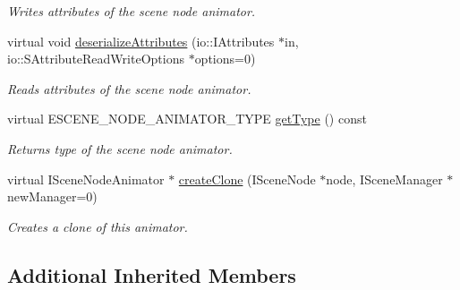 \begin{DoxyCompactItemize}
\begin{DoxyCompactList}\small\item\em Writes attributes of the scene node animator. \end{DoxyCompactList}\item 
\hypertarget{classirr_1_1scene_1_1_c_scene_node_animator_texture_a8dc3d01a8fda340020735ccc949fae3c}{virtual void \hyperlink{classirr_1_1scene_1_1_c_scene_node_animator_texture_a8dc3d01a8fda340020735ccc949fae3c}{deserialize\-Attributes} (io\-::\-I\-Attributes $\ast$in, io\-::\-S\-Attribute\-Read\-Write\-Options $\ast$options=0)}\label{classirr_1_1scene_1_1_c_scene_node_animator_texture_a8dc3d01a8fda340020735ccc949fae3c}

\begin{DoxyCompactList}\small\item\em Reads attributes of the scene node animator. \end{DoxyCompactList}\item 
\hypertarget{classirr_1_1scene_1_1_c_scene_node_animator_texture_a4f28ddc3968fc424a648f8547dfd081a}{virtual E\-S\-C\-E\-N\-E\-\_\-\-N\-O\-D\-E\-\_\-\-A\-N\-I\-M\-A\-T\-O\-R\-\_\-\-T\-Y\-P\-E \hyperlink{classirr_1_1scene_1_1_c_scene_node_animator_texture_a4f28ddc3968fc424a648f8547dfd081a}{get\-Type} () const }\label{classirr_1_1scene_1_1_c_scene_node_animator_texture_a4f28ddc3968fc424a648f8547dfd081a}

\begin{DoxyCompactList}\small\item\em Returns type of the scene node animator. \end{DoxyCompactList}\item 
virtual I\-Scene\-Node\-Animator $\ast$ \hyperlink{classirr_1_1scene_1_1_c_scene_node_animator_texture_aa2ca8317820fa7d260d25c54d315b107}{create\-Clone} (I\-Scene\-Node $\ast$node, I\-Scene\-Manager $\ast$new\-Manager=0)
\begin{DoxyCompactList}\small\item\em Creates a clone of this animator. \end{DoxyCompactList}\end{DoxyCompactItemize}
\subsection*{Additional Inherited Members}


